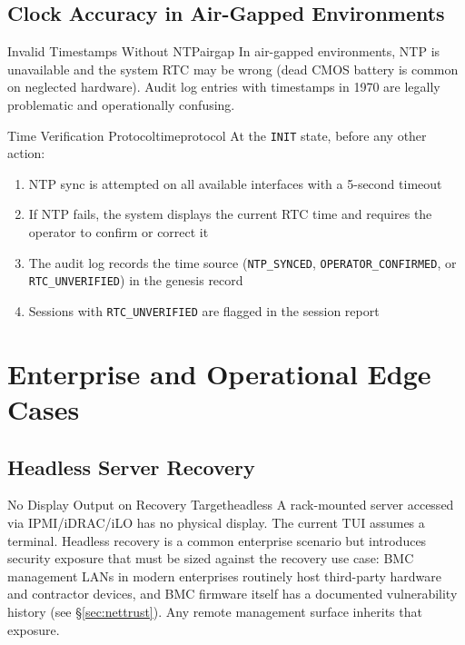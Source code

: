 \documentclass[11pt,a4paper]{report}
\begin{document}
\section{Clock Accuracy in Air-Gapped Environments}

\begin{edgecase}{Invalid Timestamps Without NTP}{airgap}
In air-gapped environments, NTP is unavailable and the system RTC may be wrong (dead CMOS battery is common on neglected hardware). Audit log entries with timestamps in 1970 are legally problematic and operationally confusing.
\end{edgecase}

\begin{solution}{Time Verification Protocol}{timeprotocol}
At the \texttt{INIT} state, before any other action:
\begin{enumerate}[noitemsep]
  \item NTP sync is attempted on all available interfaces with a 5-second timeout
  \item If NTP fails, the system displays the current RTC time and requires the operator to confirm or correct it
  \item The audit log records the time source (\texttt{NTP\_SYNCED}, \texttt{OPERATOR\_CONFIRMED}, or \texttt{RTC\_UNVERIFIED}) in the genesis record
  \item Sessions with \texttt{RTC\_UNVERIFIED} are flagged in the session report
\end{enumerate}
\end{solution}

\chapter{Enterprise and Operational Edge Cases}

\section{Headless Server Recovery}
\label{sec:headless}

\begin{edgecase}{No Display Output on Recovery Target}{headless}
A rack-mounted server accessed via IPMI/iDRAC/iLO has no physical display. The current TUI assumes a terminal. Headless recovery is a common enterprise scenario but introduces security exposure that must be sized against the recovery use case: BMC management LANs in modern enterprises routinely host third-party hardware and contractor devices, and BMC firmware itself has a documented vulnerability history (see \S\ref{sec:nettrust}). Any remote management surface inherits that exposure.
\end{edgecase}
\end{document}
